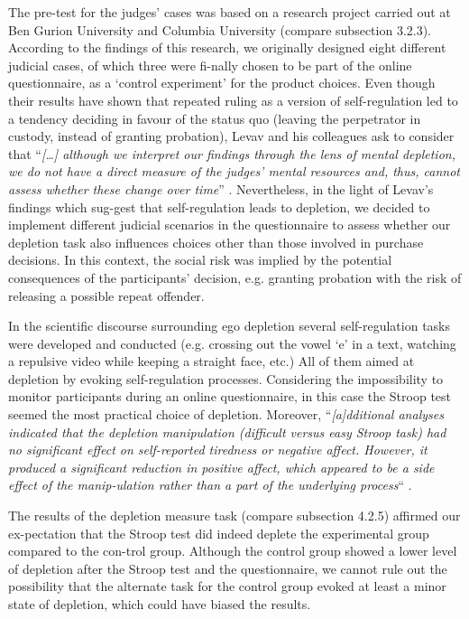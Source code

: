 The pre-test for the judges’ cases was based on a research project carried out at Ben Gurion University and Columbia University (compare subsection 3.2.3). According to the findings of this research, we originally designed eight different judicial cases, of which three were fi-nally chosen to be part of the online questionnaire, as a ‘control experiment’ for the product choices. Even though their results have shown that repeated ruling as a version of self-regulation led to a tendency deciding in favour of the status quo (leaving the perpetrator in custody, instead of granting probation), Levav and his colleagues ask to consider that “\emph{[\ldots] although we interpret our findings through the lens of mental depletion, we do not have a direct measure of the judges’ mental resources and, thus, cannot assess whether these change over time}” \citep[p.~6892]{danziger2011extraneous}. Nevertheless, in the light of Levav’s findings which sug-gest that self-regulation leads to depletion, we decided to implement different judicial scenarios in the questionnaire to assess whether our depletion task also influences choices other than those involved in purchase decisions. In this context, the social risk was implied by the potential consequences of the participants’ decision, e.g. granting probation with the risk of releasing a possible repeat offender. \par
In the scientific discourse surrounding ego depletion several self-regulation tasks were developed and conducted (e.g. crossing out the vowel ‘e’ in a text, watching a repulsive video while keeping a straight face, etc.) All of them aimed at depletion by evoking self-regulation processes. Considering the impossibility to monitor participants during an online questionnaire, in this case the Stroop test seemed the most practical choice of depletion. Moreover, “\emph{[a]dditional analyses indicated that the depletion manipulation (difficult versus easy Stroop task) had no significant effect on self-reported tiredness or negative affect. However, it produced a significant reduction in positive affect, which appeared to be a side effect of the manip-ulation rather than a part of the underlying process}“ \citep[p.~350]{pocheptsova2009deciding}.\par
The results of the depletion measure task (compare subsection 4.2.5) affirmed our ex-pectation that the Stroop test did indeed deplete the experimental group compared to the con-trol group. Although the control group showed a lower level of depletion after the Stroop test and the questionnaire, we cannot rule out the possibility that the alternate task for the control group evoked at least a minor state of depletion, which could have biased the results.\par
